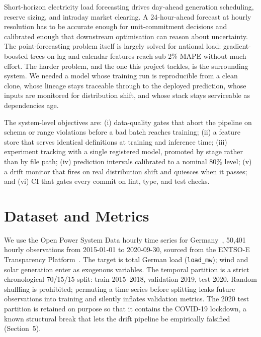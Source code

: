 \documentclass[11pt,a4paper]{article}
\newcommand{\code}[1]{\texttt{\small #1}}
\begin{document}
Short-horizon electricity load forecasting drives day-ahead generation scheduling, reserve sizing, and intraday market clearing. A 24-hour-ahead forecast at hourly resolution has to be accurate enough for unit-commitment decisions and calibrated enough that downstream optimisation can reason about uncertainty. The point-forecasting problem itself is largely solved for national load: gradient-boosted trees on lag and calendar features reach sub-2\% MAPE without much effort. The harder problem, and the one this project tackles, is the surrounding system. We needed a model whose training run is reproducible from a clean clone, whose lineage stays traceable through to the deployed prediction, whose inputs are monitored for distribution shift, and whose stack stays serviceable as dependencies age.

The system-level objectives are: (i) data-quality gates that abort the pipeline on schema or range violations before a bad batch reaches training; (ii) a feature store that serves identical definitions at training and inference time; (iii) experiment tracking with a single registered model, promoted by stage rather than by file path; (iv) prediction intervals calibrated to a nominal 80\% level; (v) a drift monitor that fires on real distribution shift and quiesces when it passes; and (vi) CI that gates every commit on lint, type, and test checks.

\section{Dataset and Metrics}

We use the Open Power System Data hourly time series for Germany~\cite{opsd2020}, 50{,}401 hourly observations from 2015-01-01 to 2020-09-30, sourced from the ENTSO-E Transparency Platform~\cite{entsoe2024transparency}. The target is total German load (\code{load\_mw}); wind and solar generation enter as exogenous variables. The temporal partition is a strict chronological 70/15/15 split: train 2015--2018, validation 2019, test 2020. Random shuffling is prohibited; permuting a time series before splitting leaks future observations into training and silently inflates validation metrics. The 2020 test partition is retained on purpose so that it contains the COVID-19 lockdown, a known structural break that lets the drift pipeline be empirically falsified (Section~5).
\end{document}
